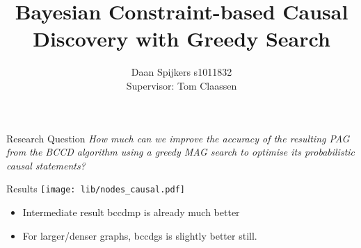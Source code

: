 \documentclass{beamer}
\title{Bayesian Constraint-based Causal Discovery with Greedy Search}
\author{Daan Spijkers s1011832 \\ Supervisor: Tom Claassen}
\begin{document}
\begin{frame}
\titlepage
\end{frame}

\begin{frame}{Research Question}
  \emph{How much can we improve the accuracy of
  the resulting PAG from the BCCD algorithm using a greedy MAG search
  to optimise its probabilistic causal statements?}
\end{frame}

\begin{frame}{Results}
  \texttt{[image: lib/nodes\_causal.pdf]}

  \begin{itemize}
    \item Intermediate result bccdmp is already much better

    \item For larger/denser graphs, bccdgs is slightly better still.
  \end{itemize}
\end{frame}
\end{document}
